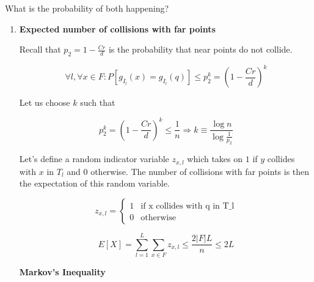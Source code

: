 \documentclass[../notes.tex]{subfiles}
\begin{document}


What is the probability of both happening?


\begin{enumerate}
    \item \textbf{Expected number of collisions with far points}


\begin{blockquote}
    Recall that $ p_2 = 1 - \frac{Cr}{d} $ is the probability that near points do not collide.
\end{blockquote}

\begin{equation}
    \forall l, \forall x \in F: P[g_{I_l}(x) = g_{I_l}(q)] \le  p_2^k = (1-\frac{Cr}{d})^k
\end{equation}


Let us choose $ k  $ such that

\begin{equation}
    p_2^k = (1-\frac{Cr}{d})^k \le  \frac{1}{n} \Rightarrow k \equiv \frac{\log n}{\log \frac{1}{p_2}}
\end{equation}


Let's define a random indicator variable $ z_{x, l} $ which takes on $ 1 $ if $ y $ collides with $ x $ in $ T_l $ and $ 0 $ otherwise.
The number of collisions with far points is then the expectation of this random variable.

\begin{equation}
    z_{x,l} =
    \begin{cases}
        1 & \text{if x collides with q in T\_l} \\
        0 & \text{otherwise}
    \end{cases}
\end{equation}

\begin{equation}
    E[X] = \sum^L_{l=1} \sum_{x \in F} z_{x,l} \le  \frac{2|F| L}{n} \le 2L
\end{equation}


\begin{definition}
    \textbf{Markov's Inequality} 


\end{definition}
\end{enumerate}
\end{document}
